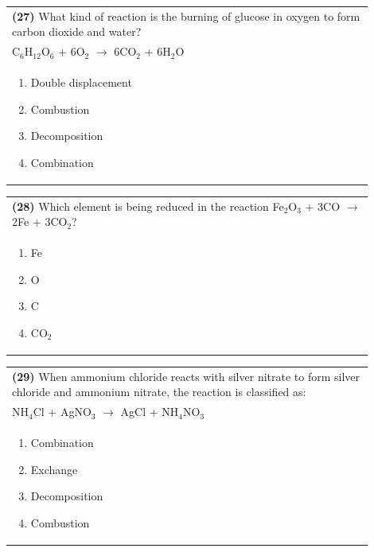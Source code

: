 \documentclass{article}
\begin{document}
\noindent\begin{tabular}{|p{0.9\linewidth}|}
\hline
\textbf{(27)} What kind of reaction is the burning of glucose in oxygen to form carbon dioxide and water?\\[0.2cm]
C$_6$H$_{12}$O$_6$ + 6O$_2$ $\rightarrow$  6CO$_2$ + 6H$_2$O\\[0.2cm]
\begin{minipage}[t]{0.85\linewidth}
\begin{enumerate}[label=\alph*.]
\item Double displacement
\item Combustion
\item Decomposition
\item Combination
\end{enumerate}
\end{minipage}\\[0.2cm]
\hline
\end{tabular}

\noindent\begin{tabular}{|p{0.9\linewidth}|}
\hline
\textbf{(28)} Which element is being reduced in the reaction Fe$_2$O$_3$ + 3CO $\rightarrow$ 2Fe + 3CO$_2$?\\[0.2cm]
\begin{minipage}[t]{0.85\linewidth}
\begin{enumerate}[label=\alph*.]
\item Fe
\item O
\item C
\item CO$_2$
\end{enumerate}
\end{minipage}\\[0.2cm]
\hline
\end{tabular}
\newpage


\noindent\begin{tabular}{|p{0.9\linewidth}|}
\hline
\textbf{(29)} When ammonium chloride reacts with silver nitrate to form silver chloride and ammonium nitrate, the reaction is classified as:\\[0.2cm]
NH$_4$Cl + AgNO$_3$ $\rightarrow$ AgCl + NH$_4$NO$_3$\\[0.2cm]
\begin{minipage}[t]{0.85\linewidth}
\begin{enumerate}[label=\alph*.]
\item Combination
\item Exchange
\item Decomposition
\item Combustion
\end{enumerate}
\end{minipage}\\[0.2cm]
\hline
\end{tabular}
\end{document}
